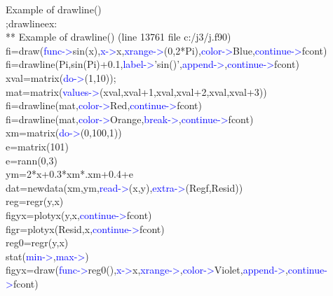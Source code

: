 \begin{example}[drawlineex]Example of \textcolor{VioletRed}{drawline}()\\
\label{drawlineex}
;drawlineex:\\
** Example of \textcolor{VioletRed}{drawline}() (line  13761 file c:/j3/j.f90)\\
fi=\textcolor{VioletRed}{draw}(\textcolor{blue}{func->}\textcolor{VioletRed}{sin}(x),\textcolor{blue}{x->}x,\textcolor{blue}{xrange->}(0,2*Pi),\textcolor{blue}{color->}Blue,\textcolor{blue}{continue->}fcont)\\
fi=\textcolor{VioletRed}{drawline}(Pi,\textcolor{VioletRed}{sin}(Pi)+0.1,\textcolor{blue}{label->}'\textcolor{VioletRed}{sin}()',\textcolor{blue}{append->},\textcolor{blue}{continue->}fcont)\\
xval=\textcolor{VioletRed}{matrix}(\textcolor{blue}{do->}(1,10));\\
mat=\textcolor{VioletRed}{matrix}(\textcolor{blue}{values->}(xval,xval+1,xval,xval+2,xval,xval+3))\\
fi=\textcolor{VioletRed}{drawline}(mat,\textcolor{blue}{color->}Red,\textcolor{blue}{continue->}fcont)\\
fi=\textcolor{VioletRed}{drawline}(mat,\textcolor{blue}{color->}Orange,\textcolor{blue}{break->},\textcolor{blue}{continue->}fcont)\\
xm=\textcolor{VioletRed}{matrix}(\textcolor{blue}{do->}(0,100,1))\\
e=\textcolor{VioletRed}{matrix}(101)\\
e=\textcolor{VioletRed}{rann}(0,3)\\
ym=2*x+0.3*xm*.xm+0.4+e\\
dat=\textcolor{VioletRed}{newdata}(xm,ym,\textcolor{blue}{read->}(x,y),\textcolor{blue}{extra->}(Regf,Resid))\\
reg=\textcolor{VioletRed}{regr}(y,x)\\
figyx=\textcolor{VioletRed}{plotyx}(y,x,\textcolor{blue}{continue->}fcont)\\
figr=\textcolor{VioletRed}{plotyx}(Resid,x,\textcolor{blue}{continue->}fcont)\\
reg0=\textcolor{VioletRed}{regr}(y,x)\\
\textcolor{VioletRed}{stat}(\textcolor{blue}{min->},\textcolor{blue}{max->})\\
figyx=\textcolor{VioletRed}{draw}(\textcolor{blue}{func->}reg0(),\textcolor{blue}{x->}x,\textcolor{blue}{xrange->},\textcolor{blue}{color->}Violet,\textcolor{blue}{append->},\textcolor{blue}{continue->}fcont)

\end{example}
